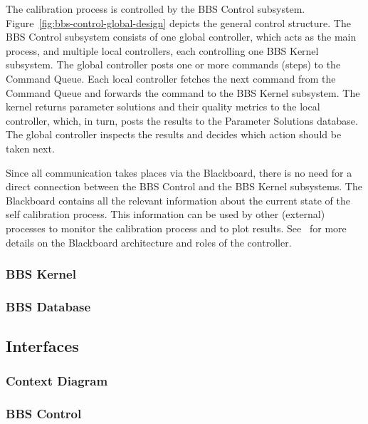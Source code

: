 \documentclass[10pt]{lofar}
\begin{document}
The calibration process is controlled by the BBS Control
subsystem. Figure~\ref{fig:bbs-control-global-design} depicts the general
control structure. The BBS Control subsystem consists of one global
controller, which acts as the main process, and multiple local controllers,
each controlling one BBS Kernel subsystem. The global controller posts one or
more commands (steps) to the Command Queue. Each local controller fetches the
next command from the Command Queue and forwards the command to the BBS Kernel
subsystem. The kernel returns parameter solutions and their quality metrics to
the local controller, which, in turn, posts the results to the Parameter
Solutions database. The global controller inspects the results and decides
which action should be taken next.

Since all communication takes places via the Blackboard, there is no need for
a direct connection between the BBS Control and the BBS Kernel subsystems.
The Blackboard contains all the relevant information about the current state
of the self calibration process. This information can be used by other
(external) processes to monitor the calibration process and to plot results.
See~\cite{LOFAR-ASTRON-SDD-002} for more details on the Blackboard
architecture and roles of the controller.


\subsubsection{BBS Kernel}
\label{subsubsec:sys-kernel}

\subsubsection{BBS Database}
\label{subsubsec:sys-database}

\subsection{Interfaces}
\label{subsec:sys-interfaces}

\subsubsection{Context Diagram}
\label{subsubsec:context}

\subsubsection{BBS Control}
\label{subsubsec:interf-control}
\end{document}
